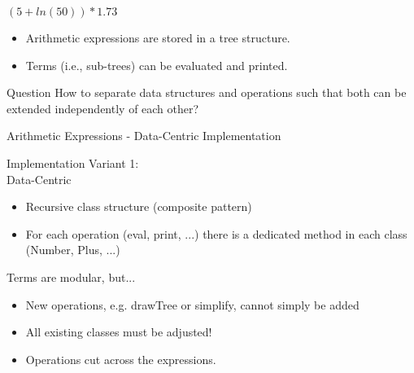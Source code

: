 \begin{frame}{\myframetitle}
	\begin{mycolumns}[widths={60}]
		\begin{exampletight}{$(5 + ln(50)) * 1.73$}
			\centering
		\end{exampletight}
	\mynextcolumn
		\begin{example}{}
			\begin{itemize}
				\item Arithmetic expressions are stored in a tree structure.
				\item Terms (i.e., sub-trees) can be evaluated and printed.
			\end{itemize}
		\end{example}
		\begin{note}{Question}
			How to separate data structures and operations such that both can be extended independently of each other?
		\end{note}
	\end{mycolumns}
\end{frame}

\begin{frame}{Arithmetic Expressions - Data-Centric Implementation}
	\begin{mycolumns}[widths={40},animation=none]
		\begin{definition}{Implementation Variant 1:\\Data-Centric}
			\begin{itemize}
				\item Recursive class structure (composite pattern)
				\item For each operation (eval, print, ...) there is a dedicated method in each class (Number, Plus, ...) 				
			\end{itemize}
		\end{definition}
		\pause
		\begin{note}{Terms are modular, but...}
			\begin{itemize}
				\item New operations, e.g. drawTree or simplify, cannot simply be added
				\item All existing classes must be adjusted!
				\item Operations cut across the expressions.
			\end{itemize}
		\end{note}
	\mynextcolumn
		\begin{exampletight}{}
		\end{exampletight}
	\end{mycolumns}
\end{frame}

